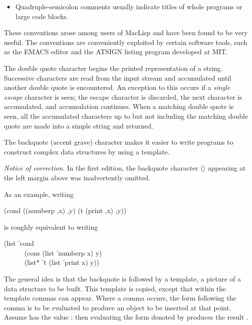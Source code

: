 \begin{flushdesc}
\begin{itemize}
\item
Quadruple-semicolon comments usually indicate titles of whole programs or large code blocks.
\end{itemize}

\beforenoterule
\begin{incompatibility}
These conventions arose among users of MacLisp
and have been found to be very useful.
The conventions are conveniently exploited by certain software tools,
such as the {EMACS} editor and the
{ATSIGN} listing program developed at {MIT}.
\end{incompatibility}
\afternoterule

\item[\cd{"}]
The double quote character begins the printed representation
of a string.
Successive characters are read from the input stream and accumulated until
another double quote is encountered.
An exception to this occurs if a {\it single escape} character
is seen; the escape character is discarded,
the next character is accumulated, and accumulation
continues.  When a matching double quote is seen, all the accumulated
characters up to but not including the matching double quote are
made into a simple string and returned.

\item[\cd{{\Xbq}}]
The backquote (accent grave) character
makes it easier to write programs to construct complex data structures by
using a template.
\label{BACKQUOTE}
\begin{new}%
{\it Notice of correction.}
In the first edition, the backquote character $\langle$\cd{\Xbq}$\rangle$
appearing at the left margin above was inadvertently omitted.
\end{new}
As an example, writing
\begin{lisp}
{\Xbq}(cond ((numberp ,x) ,{\Xatsign}y) (t (print ,x) ,{\Xatsign}y))
\end{lisp}
is roughly equivalent to writing
\begin{lisp}
(list 'cond  \\
~~~~~~(cons (list 'numberp x) y)  \\
~~~~~~(list* 't (list 'print x) y))
\end{lisp}
The general idea is that the backquote is followed by a template,
a picture of a data structure to be built.  This template is copied,
except that within the template commas can appear.  Where a comma
occurs, the form following the comma is to be evaluated to produce an object to
be inserted at that point.  Assume  has the value ; then
evaluating the form denoted by  produces
the result .


\end{flushdesc}
